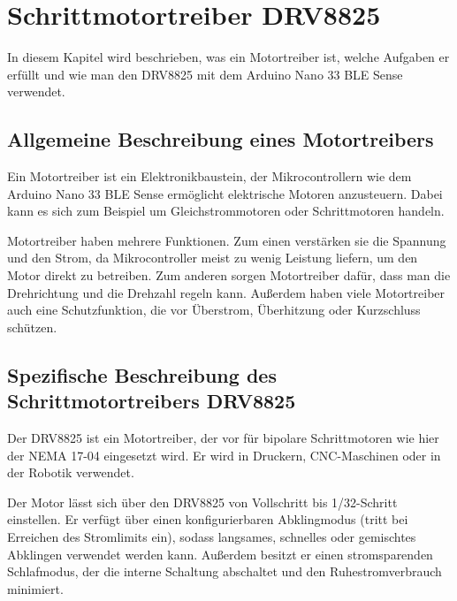 %
%

\chapter{Schrittmotortreiber DRV8825}

In diesem Kapitel wird beschrieben, was ein Motortreiber ist, welche Aufgaben er erfüllt und wie man den DRV8825 mit dem Arduino Nano 33 BLE Sense verwendet.

\section{Allgemeine Beschreibung eines Motortreibers}

Ein Motortreiber ist ein Elektronikbaustein, der Mikrocontrollern wie dem Arduino Nano 33 BLE Sense ermöglicht elektrische Motoren anzusteuern. Dabei kann es sich zum Beispiel um Gleichstrommotoren oder Schrittmotoren handeln. 

Motortreiber haben mehrere Funktionen. Zum einen verstärken sie die Spannung und den Strom, da Mikrocontroller meist zu wenig Leistung liefern, um den Motor direkt zu betreiben. Zum anderen sorgen Motortreiber dafür, dass man die Drehrichtung und die Drehzahl regeln kann. Außerdem haben viele Motortreiber auch eine Schutzfunktion, die vor Überstrom, Überhitzung oder Kurzschluss schützen.
\cite{DRV8825.1}

\section{Spezifische Beschreibung des Schrittmotortreibers DRV8825}

Der DRV8825 ist ein Motortreiber, der vor für bipolare Schrittmotoren wie hier der NEMA 17-04 eingesetzt wird. Er wird in Druckern, CNC-Maschinen oder in der Robotik verwendet.
 
Der Motor lässt sich über den DRV8825 von Vollschritt bis 1/32-Schritt einstellen. Er verfügt über einen konfigurierbaren Abklingmodus (tritt bei Erreichen des Stromlimits ein), sodass langsames, schnelles oder gemischtes Abklingen verwendet werden kann. Außerdem besitzt er einen stromsparenden Schlafmodus, der die interne Schaltung abschaltet und den Ruhestromverbrauch minimiert. 

